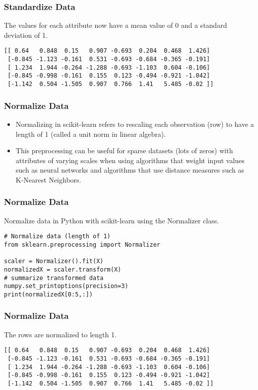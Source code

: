 \begin{frame}[fragile]\frametitle{Standardize Data}
The values for each attribute now have a mean value of 0 and a standard deviation of 1.
\begin{lstlisting}
[[ 0.64   0.848  0.15   0.907 -0.693  0.204  0.468  1.426]
 [-0.845 -1.123 -0.161  0.531 -0.693 -0.684 -0.365 -0.191]
 [ 1.234  1.944 -0.264 -1.288 -0.693 -1.103  0.604 -0.106]
 [-0.845 -0.998 -0.161  0.155  0.123 -0.494 -0.921 -1.042]
 [-1.142  0.504 -1.505  0.907  0.766  1.41   5.485 -0.02 ]]
\end{lstlisting}
\end{frame}




\begin{frame}[fragile]\frametitle{Normalize Data}

	\begin{itemize}
	\item Normalizing in scikit-learn refers to rescaling each observation (row) to have a length of 1 (called a unit norm in linear algebra).
	\item This preprocessing can be useful for sparse datasets (lots of zeros) with attributes of varying scales when using algorithms that weight input values such as neural networks and algorithms that use distance measures such as K-Nearest Neighbors.
	\end{itemize}
	
\end{frame}

\begin{frame}[fragile]\frametitle{Normalize Data}
Normalize data in Python with scikit-learn using the Normalizer class.
 \begin{lstlisting}
# Normalize data (length of 1)
from sklearn.preprocessing import Normalizer

scaler = Normalizer().fit(X)
normalizedX = scaler.transform(X)
# summarize transformed data
numpy.set_printoptions(precision=3)
print(normalizedX[0:5,:])
\end{lstlisting}
\end{frame}

\begin{frame}[fragile]\frametitle{Normalize Data}
The rows are normalized to length 1.
\begin{lstlisting}
[[ 0.64   0.848  0.15   0.907 -0.693  0.204  0.468  1.426]
 [-0.845 -1.123 -0.161  0.531 -0.693 -0.684 -0.365 -0.191]
 [ 1.234  1.944 -0.264 -1.288 -0.693 -1.103  0.604 -0.106]
 [-0.845 -0.998 -0.161  0.155  0.123 -0.494 -0.921 -1.042]
 [-1.142  0.504 -1.505  0.907  0.766  1.41   5.485 -0.02 ]]
\end{lstlisting}
\end{frame}



